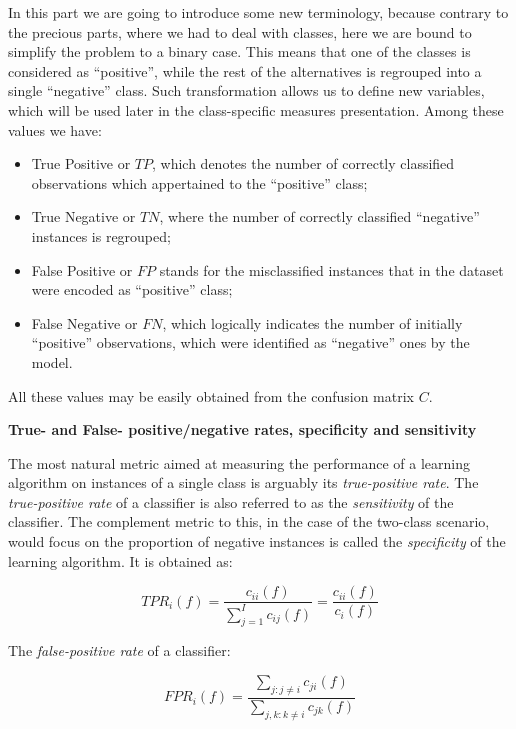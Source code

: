 \documentclass[12pt,]{article}
\providecommand{\tightlist}{%
  \setlength{\itemsep}{0pt}\setlength{\parskip}{0pt}}
\begin{document}
In this part we are going to introduce some new terminology, because
contrary to the precious parts, where we had to deal with classes, here
we are bound to simplify the problem to a binary case. This means that
one of the classes is considered as ``positive'', while the rest of the
alternatives is regrouped into a single ``negative'' class. Such
transformation allows us to define new variables, which will be used
later in the class-specific measures presentation. Among these values we
have:

\begin{itemize}
\tightlist
\item
  True Positive or \(TP\), which denotes the number of correctly
  classified observations which appertained to the ``positive'' class;
\item
  True Negative or \(TN\), where the number of correctly classified
  ``negative'' instances is regrouped;
\item
  False Positive or \(FP\) stands for the misclassified instances that
  in the dataset were encoded as ``positive'' class;
\item
  False Negative or \(FN\), which logically indicates the number of
  initially ``positive'' observations, which were identified as
  ``negative'' ones by the model.
\end{itemize}

All these values may be easily obtained from the confusion matrix \(C\).

\textbf{True- and False- positive/negative rates, specificity and
sensitivity}

The most natural metric aimed at measuring the performance of a learning
algorithm on instances of a single class is arguably its
\emph{true-positive rate}. The \emph{true-positive rate} of a classifier
is also referred to as the \emph{sensitivity} of the classifier. The
complement metric to this, in the case of the two-class scenario, would
focus on the proportion of negative instances is called the
\emph{specificity} of the learning algorithm. It is obtained as:

\begin{equation}
TPR_i (f) = \frac{c_{ii} (f)}{\sum_{j = 1}^{I} c_{ij} (f)} =
  \frac{c_{ii} (f)}{c_i (f)}
  \end{equation}

The \emph{false-positive rate} of a classifier:

\begin{equation}
FPR_i (f) = \frac{\sum_{j: j \neq i} c_{ji} (f)}
  {\sum_{j, k: k \neq i} c_{jk} (f)}
  \end{equation}
\end{document}
